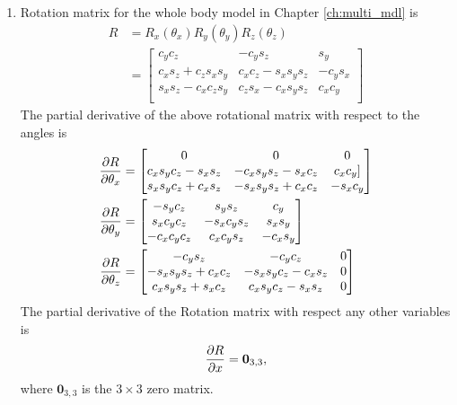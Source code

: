 \begin{enumerate}
\item Rotation matrix for the whole body model in Chapter \ref{ch:multi_mdl} is 
\begin{equation}
	\label{eq:rot_full}
	\begin{split}
	R &= R_x(\theta_x) R_y(\theta_y) R_z(\theta_z) \\
	&= 
	\begin{bmatrix}
		c_yc_z &-c_ys_z &s_y \\
		c_xs_z+c_zs_xs_y &c_xc_z-s_xs_ys_z &-c_ys_x \\
  		s_xs_z-c_xc_zs_y &c_zs_x-c_xs_ys_z & c_xc_y \\
	\end{bmatrix}
	\end{split}
\end{equation}
The partial derivative of the above rotational matrix with respect to the angles is
\begin{equation}
	\begin{split}
	\frac{\partial {R}}{\partial {\theta_x}} &=
	\begin{bmatrix} 
		0 &0 &0 \\
        c_xs_yc_z-s_xs_z &-c_xs_ys_z-s_xc_z &c_xc_y]\\
        s_xs_yc_z+c_xs_z &-s_xs_ys_z+c_xc_z &-s_xc_y
	\end{bmatrix}\\
	\frac{\partial {R}}{\partial {\theta_y}}&=
	\begin{bmatrix}
    -s_yc_z &s_ys_z &c_y \\
     s_xc_yc_z &-s_xc_ys_z & s_xs_y \\
    -c_xc_yc_z & c_xc_ys_z &-c_xs_y
	\end{bmatrix}\\
	\frac{\partial {R}}{\partial {\theta_z}}&=
	\begin{bmatrix}
    -c_ys_z &-c_yc_z &0 \\
    -s_xs_ys_z+c_xc_z &-s_xs_yc_z-c_xs_z &0 \\
     c_xs_ys_z+s_xc_z &c_xs_yc_z-s_xs_z &0
	\end{bmatrix}
	\end{split}
\end{equation}
The partial derivative of the Rotation matrix with respect any other variables is
$$ \frac{\partial {R}}{\partial {x}} = \textbf{0}_{3,3},$$ where $\textbf{0}_{3,3}$ is the $3 \times 3$ zero matrix.


\end{enumerate}
